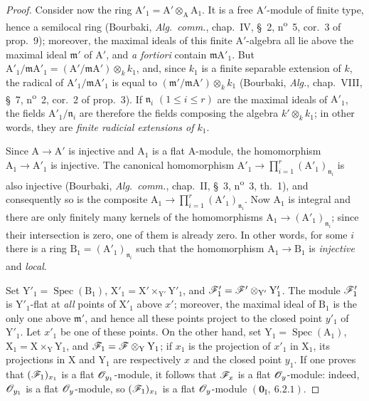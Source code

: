 \begin{proof}
Consider now the ring $\mathrm{A}'_1=\mathrm{A}'\otimes_\mathrm{A}\mathrm{A}_1$.
It is a free $\mathrm{A}'$-module of finite type, hence a semilocal ring (Bourbaki, \emph{Alg.\ comm.}, chap.~IV, \S~2, n\textsuperscript{o}~5, cor.~3 of prop.~9); moreover, the maximal ideals of this finite $\mathrm{A}'$-algebra all lie above the maximal ideal $\mathfrak{m}'$ of $\mathrm{A}'$, and \emph{a fortiori} contain $\mathfrak{m}\mathrm{A}'_1$.
But $\mathrm{A}'_1/\mathfrak{m}\mathrm{A}'_1=(\mathrm{A}'/\mathfrak{m}\mathrm{A}')\otimes_k k_1$,
and, since $k_1$ is a finite separable extension of $k$, the radical of $\mathrm{A}'_1/\mathfrak{m}\mathrm{A}'_1$ is equal to $(\mathfrak{m}'/\mathfrak{m}\mathrm{A}')\otimes_k k_1$ (Bourbaki, \emph{Alg.}, chap.~VIII, \S~7, n\textsuperscript{o}~2, cor.~2 of prop.~3).
If $\mathfrak{n}_i$ $(1\leq i\leq r)$ are the maximal ideals of $\mathrm{A}'_1$, the fields $\mathrm{A}'_1/\mathfrak{n}_i$ are therefore the fields composing the algebra $k'\otimes_k k_1$; in other words, they are \emph{finite radicial extensions of $k_1$}.

Since $\mathrm{A}\to\mathrm{A}'$ is injective and $\mathrm{A}_1$ is a flat $\mathrm{A}$-module, the homomorphism $\mathrm{A}_1\to\mathrm{A}'_1$ is injective.
The canonical homomorphism $\mathrm{A}'_1\longrightarrow\prod_{i=1}^{r}(\mathrm{A}'_1)_{\mathfrak{n}_i}$
is also injective (Bourbaki, \emph{Alg.\ comm.}, chap.~II, \S~3, n\textsuperscript{o}~3, th.~1), and consequently so is the composite $\mathrm{A}_1\to\prod_{i=1}^{r}(\mathrm{A}'_1)_{\mathfrak{n}_i}$.
Now $\mathrm{A}_1$ is integral and there are only finitely many kernels of the homomorphisms $\mathrm{A}_1\to(\mathrm{A}'_1)_{\mathfrak{n}_i}$; since their intersection is zero, one of them is already zero.
In other words, for some $i$ there is a ring $\mathrm{B}_1=(\mathrm{A}'_1)_{\mathfrak{n}_i}$ such that the homomorphism $\mathrm{A}_1\to\mathrm{B}_1$ is \emph{injective} and \emph{local}.

Set $\mathrm{Y}'_1=\operatorname{Spec}(\mathrm{B}_1)$, $\mathrm{X}'_1=\mathrm{X}'\times_{\mathrm{Y}'}\mathrm{Y}'_1$, and $\mathscr{F}'_1=\mathscr{F}'\otimes_{\mathrm{Y}'}\mathrm{Y}'_1$.
The module $\mathscr{F}'_1$ is $\mathrm{Y}'_1$-flat at \emph{all} points of $\mathrm{X}'_1$ above $x'$; moreover, the maximal ideal of $\mathrm{B}_1$ is the only one above $\mathfrak{m}'$, and hence all these points project to the closed point $y'_1$ of $\mathrm{Y}'_1$.
Let $x'_1$ be one of these points.
On the other hand, set $\mathrm{Y}_1=\operatorname{Spec}(\mathrm{A}_1)$, $\mathrm{X}_1=\mathrm{X}\times_\mathrm{Y}\mathrm{Y}_1$, and $\mathscr{F}_1=\mathscr{F}\otimes_\mathrm{Y}\mathrm{Y}_1$; if $x_1$ is the projection of $x'_1$ in $\mathrm{X}_1$, its projections in $\mathrm{X}$ and $\mathrm{Y}_1$ are respectively $x$ and the closed point $y_1$.
If one proves that $(\mathscr{F}_1)_{x_1}$ is a flat $\mathscr{O}_{y_1}$-module, it follows that $\mathscr{F}_x$ is a flat $\mathscr{O}_y$-module: indeed, $\mathscr{O}_{y_1}$ is a flat $\mathscr{O}_y$-module, so $(\mathscr{F}_1)_{x_1}$ is a flat $\mathscr{O}_y$-module $(\mathbf{0}_\mathrm{I},~6.2.1)$.


\end{proof}
